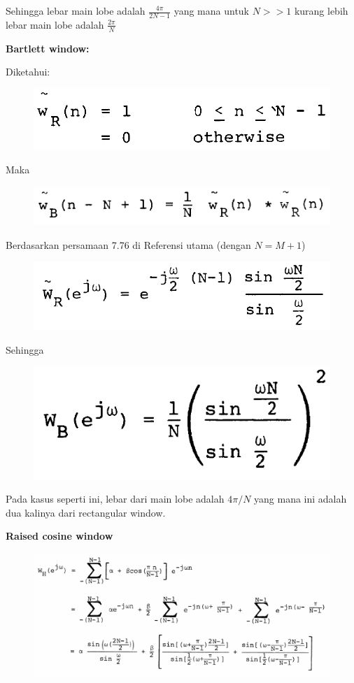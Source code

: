 \documentclass[12pt,a4paper]{article}
\begin{document}
\begin{enumerate}
		Sehingga lebar main lobe adalah $ \frac{4 \pi}{2N - 1} $ yang mana untuk $ N >> 1 $ kurang lebih lebar main lobe adalah $ \frac{2 \pi}{N} $
		
		\pagebreak
		\textbf{Bartlett window:}
		
		Diketahui: 
		
		\begin{figure}[H]
			\centering
			\includegraphics[width=0.4\linewidth]{img/img03}
		\end{figure}
		
		Maka 
		
		\begin{figure}[H]
			\centering
			\includegraphics[width=0.4\linewidth]{img/img04}
		\end{figure}
		
		Berdasarkan persamaan 7.76 di Referensi utama (dengan $ N = M + 1 $)
		
		\begin{figure}[H]
			\centering
			\includegraphics[width=0.4\linewidth]{img/img05}
		\end{figure}
		
		Sehingga
		
		\begin{figure}[H]
			\centering
			\includegraphics[width=0.4\linewidth]{img/img06}
		\end{figure}
		
		Pada kasus seperti ini, lebar dari main lobe adalah $ 4\pi / N $ yang mana ini adalah dua kalinya dari rectangular window.
		
		\pagebreak
		\textbf{Raised cosine window}
		
		\begin{figure}[H]
			\centering
			\includegraphics[width=0.8\linewidth]{img/img07}
		\end{figure}
		

\end{enumerate}
\end{document}
